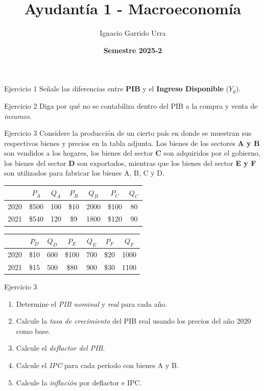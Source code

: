 \documentclass{beamer}
\title{Ayudantía 1 - Macroeconomía}
\author{Ignacio Garrido Urra}
\date{\textbf{Semestre 2025-2}}
\begin{document}
\frame{\titlepage}

\begin{frame}{Ejercicio 1}
Señale las diferencias entre \textbf{PIB} y el \textbf{Ingreso Disponible} ($Y_d$).
\end{frame}

\begin{frame}{Ejercicio 2}
Diga por qué no se contabiliza dentro del PIB a la compra y venta de \textit{insumos}.
\end{frame}

\begin{frame}{Ejercicio 3}
Considere la producción de un cierto país en donde se muestran sus respectivos bienes y precios en la tabla adjunta. 
Los bienes de los sectores \textbf{A y B} son vendidos a los hogares, los bienes del sector \textbf{C} son adquiridos por el gobierno, 
los bienes del sector \textbf{D} son exportados, mientras que los bienes del sector \textbf{E y F} son utilizados para fabricar los bienes A, B, C y D.

\medskip
\begin{center}
\begin{tabular}{lcccccc}
\hline
 & $P_A$ & $Q_A$ & $P_B$ & $Q_B$ & $P_C$ & $Q_C$ \\
\hline
2020 & \$500 & 100 & \$10 & 2000 & \$100 & 80 \\
2021 & \$540 & 120 & \$9 & 1800 & \$120 & 90 \\
\hline
\end{tabular}

\medskip
\begin{tabular}{lcccccc}
\hline
 & $P_D$ & $Q_D$ & $P_E$ & $Q_E$ & $P_F$ & $Q_F$ \\
\hline
2020 & \$10 & 600 & \$100 & 700 & \$20 & 1000 \\
2021 & \$15 & 500 & \$80 & 900 & \$30 & 1100 \\
\hline
\end{tabular}
\end{center}
\end{frame}


\begin{frame}{Ejercicio 3}
\medskip
\begin{enumerate}
\item[(a)] Determine el \textit{PIB nominal} y \textit{real} para cada año.
\item[(b)] Calcule la \textit{tasa de crecimiento} del PIB real usando los precios del año 2020 como base.
\item[(c)] Calcule el \textit{deflactor del PIB}.
\item[(d)] Calcule el \textit{IPC} para cada período con bienes A y B.
\item[(e)] Calcule la \textit{inflación} por deflactor e IPC.
\end{enumerate}
\end{frame}
\end{document}
